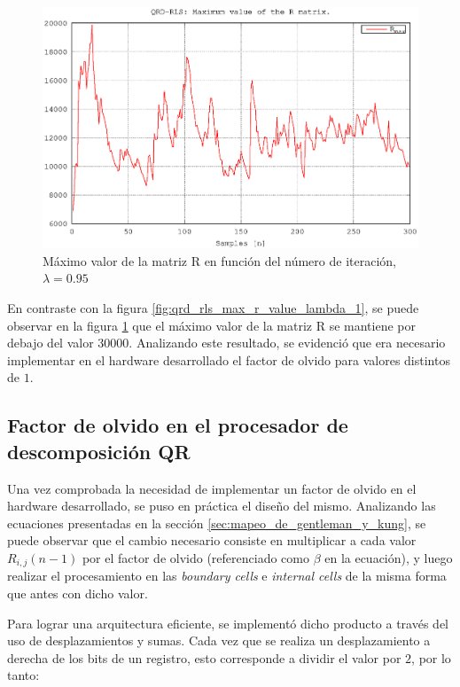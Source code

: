 \begin{figure}[!hbt]
  \begin{center}
    \includegraphics[width=12 cm]{./figures/C05-qrd_rls_max_r_value_lambda_095}
    \caption{Máximo valor de la matriz R en función del número de iteración, $\lambda = 0.95$}
    \label{fig:qrd_rls_max_r_value_lambda_095}
  \end{center}
\end{figure}

En contraste con la figura \ref{fig:qrd_rls_max_r_value_lambda_1}, se puede observar en la figura \ref{fig:qrd_rls_max_r_value_lambda_095} que el máximo valor de la matriz R se mantiene por debajo del valor 30000. Analizando este resultado, se evidenció que era necesario implementar en el hardware desarrollado el factor de olvido para valores distintos de $1$.

\subsection{Factor de olvido en el procesador de descomposición QR}

Una vez comprobada la necesidad de implementar un factor de olvido en el hardware desarrollado, se puso en práctica el diseño del mismo. Analizando las ecuaciones presentadas en la sección \ref{sec:mapeo_de_gentleman_y_kung}, se puede observar que el cambio necesario consiste en multiplicar a cada valor $R_{i,j}(n-1)$ por el factor de olvido (referenciado como $\beta$ en la ecuación), y luego realizar el procesamiento en las \textit{boundary cells} e \textit{internal cells} de la misma forma que antes con dicho valor.

Para lograr una arquitectura eficiente, se implementó dicho producto a través del uso de desplazamientos y sumas. Cada vez que se realiza un desplazamiento a derecha de los bits de un registro, esto corresponde a dividir el valor por $2$, por lo tanto:

